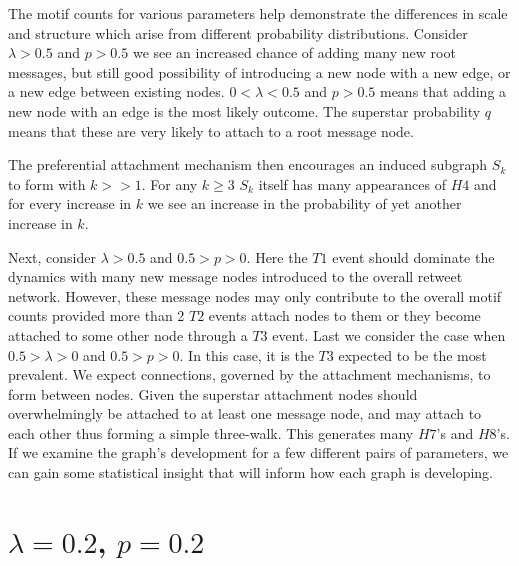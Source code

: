 The motif counts for various parameters help demonstrate the differences in scale 
and structure which arise from different probability distributions. 
Consider $\lambda>0.5$ and $p>0.5$ we see an increased chance of adding
many new root messages, but still good possibility of introducing a new node with a new edge,
or a new edge between existing nodes. $0<\lambda<0.5$ and $p>0.5$ means that adding a new node
with an edge is the most likely outcome. The superstar probability $q$ means that these
are very likely to attach to a root message node.

The preferential attachment mechanism then encourages
 an induced subgraph $S_{k}$ to form with $k>>1$.
 For any $k\geq3$ $S_{k}$
itself has many appearances of $H4$ and for every increase in $k$ we see an increase in the probability
of yet another increase in $k$.

Next, consider $\lambda>0.5$ and $0.5>p>0$. Here the $T1$ event should dominate the dynamics
 with many new message nodes introduced to the overall retweet network. However, these
message nodes may only contribute to the overall motif counts provided more than 2 $T2$  events
attach nodes to them or they become attached to some other node through a $T3$ event.
Last we consider the case when $0.5>\lambda>0$ and $0.5>p>0$. In this case, it is the $T3$
 expected to be the most prevalent. We expect connections, governed by the attachment mechanisms, to form between nodes. Given
the superstar attachment nodes should overwhelmingly be attached to at least one message node, and may attach 
to each other thus forming a simple three-walk. This generates many $H7$'s and $H8$'s. If we examine the graph's development for a few different pairs of parameters, we can gain some statistical insight that
will inform how each graph is developing.


\clearpage

\section{$\lambda=0.2$, $p=0.2$}


